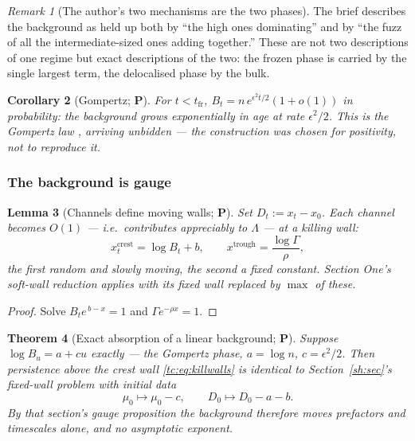\documentclass[11pt]{article}
\numberwithin{equation}{section}
\theoremstyle{plain}
\newtheorem{theorem}{Theorem}[section]
\newtheorem{lemma}[theorem]{Lemma}
\newtheorem{corollary}[theorem]{Corollary}
\theoremstyle{definition}
\theoremstyle{remark}
\newtheorem{remark}[theorem]{Remark}
\begin{document}
\begin{remark}[The author's two mechanisms are the two phases]
\label{tc:rem:twophases}
The brief describes the background as held up both by ``the high ones
dominating'' and by ``the fuzz of all the intermediate-sized ones adding
together.'' These are not two descriptions of one regime but exact
descriptions of the two: the frozen phase is carried by the single
largest term, the delocalised phase by the bulk.
\end{remark}

\begin{corollary}[Gompertz; \textbf{P}]\label{tc:cor:gompertz}
For $t<t_{\mathrm{fr}}$, $B_t=n\,e^{\epsilon^{2}t/2}(1+o(1))$ in
probability: the background grows exponentially in age at rate
$\epsilon^{2}/2$. This is the Gompertz law \cite{Gom25}, arriving
unbidden --- the construction was chosen for positivity, not to
reproduce it.
\end{corollary}

\subsubsection{The background is gauge}\label{tc:subsub:gauge}

\begin{lemma}[Channels define moving walls; \textbf{P}]
\label{tc:lem:walls}
Set $D_t:=x_t-x_0$. Each channel becomes $O(1)$ --- i.e.\ contributes
appreciably to $\Lambda$ --- at a \emph{killing wall}:
\begin{equation}\label{tc:eq:killwalls}
x^{\mathrm{crest}}_t=\log B_t+b,
\qquad
x^{\mathrm{trough}}=\frac{\log\Gamma}{\rho},
\end{equation}
the first random and slowly moving, the second a fixed constant. Section
One's soft-wall reduction applies with its fixed wall replaced by
$\max$ of these.
\end{lemma}

\begin{proof}
Solve $B_te^{\,b-x}=1$ and $\Gamma e^{-\rho x}=1$.
\end{proof}

\begin{theorem}[Exact absorption of a linear background; \textbf{P}]
\label{tc:thm:absorb}
Suppose $\log B_u=a+cu$ exactly --- the Gompertz phase, $a=\log n$,
$c=\epsilon^{2}/2$. Then persistence above the crest wall
\eqref{tc:eq:killwalls} is \emph{identical} to Section~\ref{sh:sec}'s fixed-wall
problem with initial data
\begin{equation}\label{tc:eq:shift}
\mu_0\longmapsto\mu_0-c,\qquad D_0\longmapsto D_0-a-b .
\end{equation}
By that section's gauge proposition the background therefore moves
prefactors and timescales alone, and no asymptotic exponent.
\end{theorem}
\end{document}
